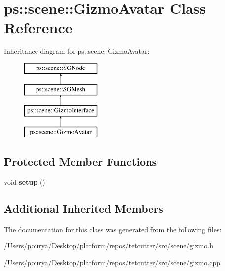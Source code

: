 \hypertarget{classps_1_1scene_1_1GizmoAvatar}{}\section{ps\+:\+:scene\+:\+:Gizmo\+Avatar Class Reference}
\label{classps_1_1scene_1_1GizmoAvatar}
Inheritance diagram for ps\+:\+:scene\+:\+:Gizmo\+Avatar\+:\begin{figure}[H]
\begin{center}
\leavevmode
\includegraphics[height=4.000000cm]{classps_1_1scene_1_1GizmoAvatar}
\end{center}
\end{figure}
\subsection*{Protected Member Functions}
\begin{DoxyCompactItemize}
\item 
\hypertarget{classps_1_1scene_1_1GizmoAvatar_a0109b1363d93e3be2d32a9499e6458b8}{}void {\bfseries setup} ()\label{classps_1_1scene_1_1GizmoAvatar_a0109b1363d93e3be2d32a9499e6458b8}

\end{DoxyCompactItemize}
\subsection*{Additional Inherited Members}


The documentation for this class was generated from the following files\+:\begin{DoxyCompactItemize}
\item 
/\+Users/pourya/\+Desktop/platform/repos/tetcutter/src/scene/gizmo.\+h\item 
/\+Users/pourya/\+Desktop/platform/repos/tetcutter/src/scene/gizmo.\+cpp\end{DoxyCompactItemize}
